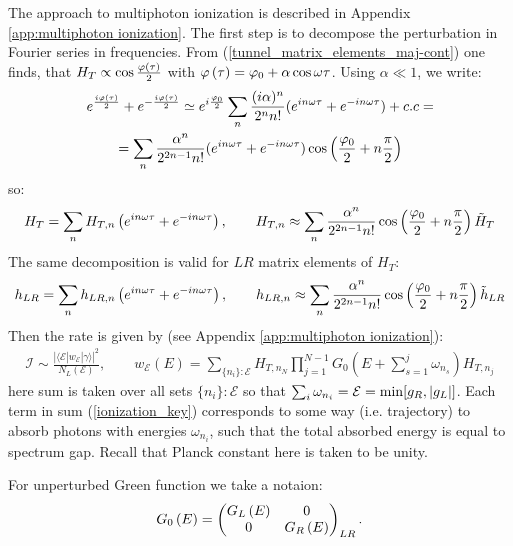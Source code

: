 The approach to multiphoton ionization is described in Appendix \ref{app:multiphoton ionization}.  The first step is to decompose the  perturbation in Fourier series in frequencies. From  (\ref{tunnel_matrix_elements_maj-cont}) one finds, that $ H_T\propto\cos\frac{\varphi\left(\tau\right)}{2} $ with $ \varphi\left(\tau\right)=\varphi_{0}+\alpha\cos\omega \tau $. Using $ \alpha\ll1 $, we write:
\begin{multline}
	e^{\frac{i\varphi\left(\tau\right)}{2}}+e^{-\frac{i\varphi\left(\tau\right)}{2}}\simeq e^{i\frac{\varphi_{0}}{2}}\sum_{n}\frac{(i\alpha)^{n}}{2^{n}n!}(e^{in\omega \tau}+e^{-in\omega \tau})+c.c=
	\\
	=\sum_{n}\frac{\alpha{}^{n}}{2^{2n-1}n!}(e^{in\omega \tau}+e^{-in\omega \tau})\cos\left(\frac{\varphi_{0}}{2}+n\frac{\pi}{2}\right)
\end{multline}
so:
\begin{gather}
\label{tunnel_hamiltonian_harmonics}
	H_{T}=
	\sum_n
	H_{T,n}
	\left(
	e^{in\omega\tau }
	+
	e^{-in\omega\tau }
	\right),
	\qquad
	H_{T,n}
	\approx
	\sum_{n}	
	\frac
	{\alpha^{n}}
	{2^{2n-1}n!}
	\cos\left(\frac{\varphi_{0}}{2}+n\frac{\pi}{2}\right)
	\tilde{H}_{T}
\end{gather}
The same decomposition is valid for $ LR $ matrix elements of $ H_T $:
\begin{gather}
h_{LR}=
\sum_n
h_{LR,n}
\left(
	e^{in\omega\tau }
	+
	e^{-in\omega\tau }
\right),
\qquad
h_{LR,n}
\approx
\sum_{n}	
\frac
{\alpha^{n}}
{2^{2n-1}n!}
\cos\left(\frac{\varphi_{0}}{2}+n\frac{\pi}{2}\right)
\tilde{h}_{LR}
\end{gather}
Then the rate is given by (see Appendix \ref{app:multiphoton ionization}):
\begin{gather}
\label{ionization_key}
\mathcal{I}
\sim
\frac{|\langle\mathcal{E}|w_{\mathcal{E}}|\gamma\rangle|^{2}}{N_L(\mathcal{E})},
\qquad
w_{\mathcal{E}}(E)
=
\sum_{\{n_{i}\}:\mathcal{E}}H_{T,n_{N}}\prod_{j=1}^{N-1}G_{0}\left(E+\sum_{s=1}^{j}\omega_{n_{s}}\right)H_{T,n_{j}}
\end{gather}
here sum is taken over all sets $ \{n_i\}:\mathcal{E} $ so that $ \sum_{i} \omega_{n_i}=\mathcal{E}=\min[g_R, \left|g_L\right|]$.  Each term in sum (\ref{ionization_key}) corresponds to some way (i.e. trajectory) to absorb photons with energies $ \omega_{n_i} $, such that the total absorbed energy is equal to spectrum gap. Recall that Planck constant here is taken to be unity.

For unperturbed Green function we take a notaion:
\begin{gather}
	G_0\left(E\right)
	=
	\begin{pmatrix}
	G_L\left(E\right) & 0 \\
	0 & G_R\left(E\right)
	\end{pmatrix}_{LR}.
\end{gather}

